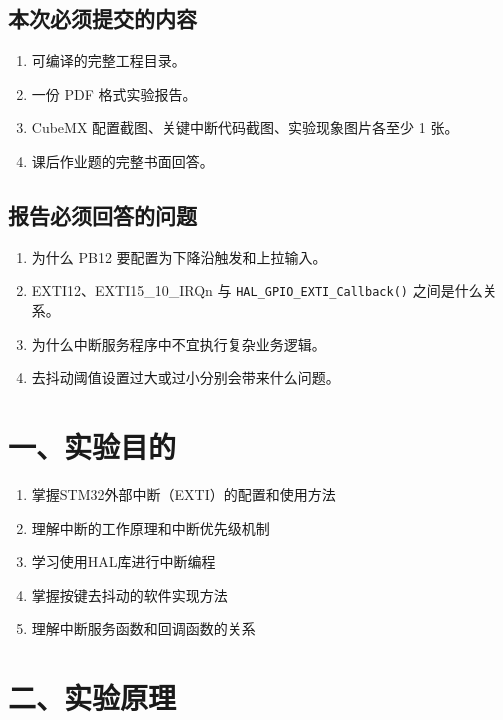 \documentclass[
  chinese,
  UTF8,
  oneside,
  openany]{ctexbook}
\providecommand{\tightlist}{%
  \setlength{\itemsep}{0pt}\setlength{\parskip}{0pt}}
\begin{document}
\subsection{本次必须提交的内容}\label{ux672cux6b21ux5fc5ux987bux63d0ux4ea4ux7684ux5185ux5bb9-2}

\begin{enumerate}
\def\labelenumi{\arabic{enumi}.}
\tightlist
\item
  可编译的完整工程目录。
\item
  一份 PDF 格式实验报告。
\item
  CubeMX 配置截图、关键中断代码截图、实验现象图片各至少 1 张。
\item
  课后作业题的完整书面回答。
\end{enumerate}

\subsection{报告必须回答的问题}\label{ux62a5ux544aux5fc5ux987bux56deux7b54ux7684ux95eeux9898-2}

\begin{enumerate}
\def\labelenumi{\arabic{enumi}.}
\tightlist
\item
  为什么 PB12 要配置为下降沿触发和上拉输入。
\item
  EXTI12、EXTI15\_10\_IRQn 与 \texttt{HAL\_GPIO\_EXTI\_Callback()}
  之间是什么关系。
\item
  为什么中断服务程序中不宜执行复杂业务逻辑。
\item
  去抖动阈值设置过大或过小分别会带来什么问题。
\end{enumerate}

\section{一、实验目的}\label{ux4e00ux5b9eux9a8cux76eeux7684-1}

\begin{enumerate}
\def\labelenumi{\arabic{enumi}.}
\tightlist
\item
  掌握STM32外部中断（EXTI）的配置和使用方法
\item
  理解中断的工作原理和中断优先级机制
\item
  学习使用HAL库进行中断编程
\item
  掌握按键去抖动的软件实现方法
\item
  理解中断服务函数和回调函数的关系
\end{enumerate}

\section{二、实验原理}\label{ux4e8cux5b9eux9a8cux539fux7406}
\end{document}
